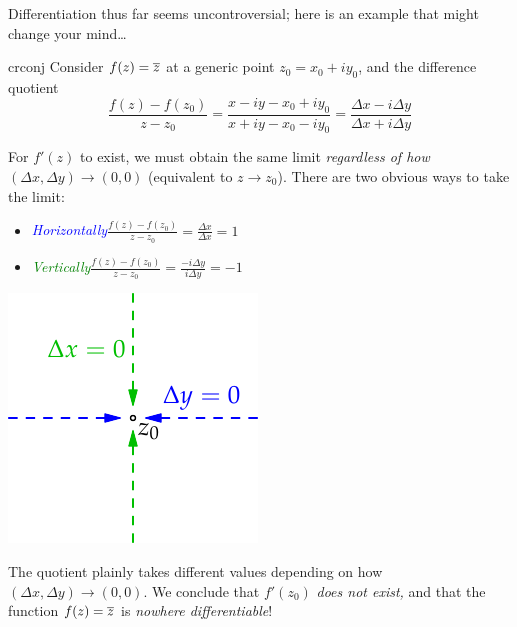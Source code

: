 \vfil\goodbreak



Differentiation thus far seems uncontroversial; here is an example that might change your mind\ldots

\begin{example}{}{crconj}
	Consider  $f(z)=\overline{z}$ at a generic point $z_0=x_0+iy_0$, and the difference quotient
  \[
   	\frac{f(z)-f(z_0)}{z-z_0}=  \frac{x-iy-x_0+iy_0}{x+iy-x_0-iy_0} = \frac{\Delta x-i\Delta y}{\Delta x+i\Delta y} \tag{where $\Delta x=x-x_0$ and $\Delta y=y-y_0$}
  \]
  \begin{minipage}[t]{0.7\linewidth}\vspace{0pt}
	  For $f'(z)$ to exist, we must obtain the same limit \emph{regardless of how $(\Delta x,\Delta y)\to (0,0)$} (equivalent to $z\to z_0$). There are two obvious ways to take the limit:
	  \begin{itemize}
		  \item[]\normalfont\emph{\textcolor{blue}{Horizontally}}\quad $\displaystyle \frac{f(z)-f(z_0)}{z-z_0} =\frac{\Delta x}{\Delta x}=1$
		  \item[]\normalfont\emph{\textcolor{Green}{Vertically}}\quad $\displaystyle\frac{f(z)-f(z_0)}{z-z_0} =\frac{-i\Delta y}{i\Delta y}=-1$
	  \end{itemize}
  \end{minipage}
  \hfill
  \begin{minipage}[t]{0.29\linewidth}\vspace{-15pt}
  \flushright\includegraphics{diff-cr}  
  \end{minipage}
  \smallbreak
  The quotient plainly takes different values depending on how $(\Delta x,\Delta y)\to(0,0)$. We conclude that $f'(z_0)$ \emph{does not exist,} and that the function $f(z)=\overline{z}$ is \emph{nowhere differentiable}!
\end{example}

